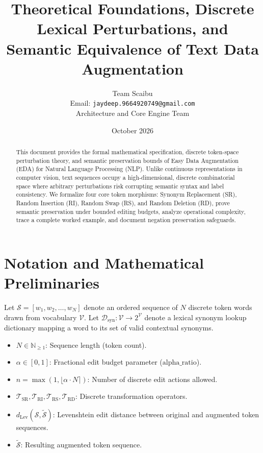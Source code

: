 \documentclass[11pt,a4paper]{article}
\title{\textbf{Theoretical Foundations, Discrete Lexical Perturbations, and Semantic Equivalence of Text Data Augmentation}}
\author{Team Scaibu \\ \small Email: \texttt{jaydeep.9664920749@gmail.com} \\ \small Architecture and Core Engine Team}
\date{October 2026}
\theoremstyle{definition}
\begin{document}
\maketitle

\begin{abstract}
This document provides the formal mathematical specification, discrete token-space perturbation theory, and semantic preservation bounds of Easy Data Augmentation (EDA) for Natural Language Processing (NLP). Unlike continuous representations in computer vision, text sequences occupy a high-dimensional, discrete combinatorial space where arbitrary perturbations risk corrupting semantic syntax and label consistency. We formalize four core token morphisms: Synonym Replacement (SR), Random Insertion (RI), Random Swap (RS), and Random Deletion (RD), prove semantic preservation under bounded editing budgets, analyze operational complexity, trace a complete worked example, and document negation preservation safeguards.
\end{abstract}

\section{Notation and Mathematical Preliminaries}

Let $\mathcal{S} = [w_1, w_2, \dots, w_N]$ denote an ordered sequence of $N$ discrete token words drawn from vocabulary $\mathcal{V}$. Let $\mathcal{D}_{\text{syn}}: \mathcal{V} \to 2^{\mathcal{V}}$ denote a lexical synonym lookup dictionary mapping a word to its set of valid contextual synonyms.

\begin{itemize}
    \item $N \in \mathbb{N}_{\ge 1}$: Sequence length (token count).
    \item $\alpha \in [0, 1]$: Fractional edit budget parameter ($\text{alpha\_ratio}$).
    \item $n = \max(1, \lfloor \alpha \cdot N \rceil)$: Number of discrete edit actions allowed.
    \item $\mathcal{T}_{\text{SR}}, \mathcal{T}_{\text{RI}}, \mathcal{T}_{\text{RS}}, \mathcal{T}_{\text{RD}}$: Discrete transformation operators.
    \item $d_{\text{Lev}}(\mathcal{S}, \tilde{\mathcal{S}})$: Levenshtein edit distance between original and augmented token sequences.
    \item $\tilde{\mathcal{S}}$: Resulting augmented token sequence.
\end{itemize}
\end{document}
